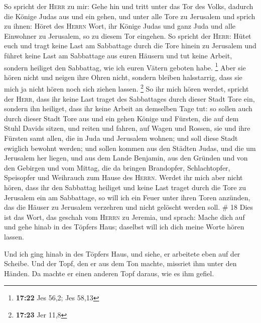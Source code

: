  So spricht der \textsc{Herr} zu mir: Gehe hin und tritt
unter das Tor des Volks, dadurch die Könige Judas aus und ein gehen, und
unter alle Tore zu Jerusalem  und sprich zu ihnen: Höret
des \textsc{Herrn} Wort, ihr Könige Judas und ganz Juda und alle
Einwohner zu Jerusalem, so zu diesem Tor eingehen.  So
spricht der \textsc{Herr}: Hütet euch und tragt keine Last am Sabbattage
durch die Tore hinein zu Jerusalem  und führet keine Last
am Sabbattage aus euren Häusern und tut keine Arbeit, sondern heiliget
den Sabbattag, wie ich euren Vätern geboten habe. \footnote{\textbf{17:22}
  Jes 56,2; Jes 58,13}  Aber sie hören nicht und neigen
ihre Ohren nicht, sondern bleiben halsstarrig, dass sie mich ja nicht
hören noch sich ziehen lassen. \footnote{\textbf{17:23} Jer 11,8}
 So ihr mich hören werdet, spricht der \textsc{Herr},
dass ihr keine Last traget des Sabbattages durch dieser Stadt Tore ein,
sondern ihn heiliget, dass ihr keine Arbeit an demselben Tage tut:
 so sollen auch durch dieser Stadt Tore aus und ein gehen
Könige und Fürsten, die auf dem Stuhl Davids sitzen, und reiten und
fahren, auf Wagen und Rossen, sie und ihre Fürsten samt allen, die in
Juda und Jerusalem wohnen; und soll diese Stadt ewiglich bewohnt werden;
 und sollen kommen aus den Städten Judas, und die um
Jerusalem her liegen, und aus dem Lande Benjamin, aus den Gründen und
von den Gebirgen und vom Mittag, die da bringen Brandopfer,
Schlachtopfer, Speisopfer und Weihrauch zum Hause des \textsc{Herrn}.
 Werdet ihr mich aber nicht hören, dass ihr den Sabbattag
heiliget und keine Last traget durch die Tore zu Jerusalem ein am
Sabbattage, so will ich ein Feuer unter ihren Toren anzünden, das die
Häuser zu Jerusalem verzehren und nicht gelöscht werden soll. \# 18
 Dies ist das Wort, das geschah vom \textsc{Herrn} zu
Jeremia, und sprach:  Mache dich auf und gehe hinab in des
Töpfers Haus; daselbst will ich dich meine Worte hören lassen.

 Und ich ging hinab in des Töpfers Haus, und siehe, er
arbeitete eben auf der Scheibe.  Und der Topf, den er aus
dem Ton machte, missriet ihm unter den Händen. Da machte er einen
anderen Topf daraus, wie es ihm gefiel.

